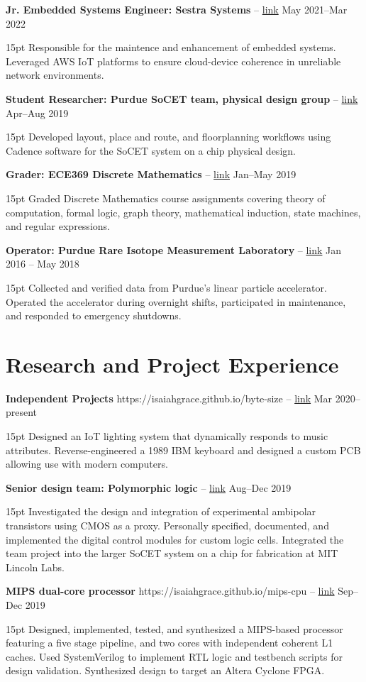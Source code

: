 \documentclass[10pt,letterpaper]{article}
\newcommand{\resumeItem}[4]{
	\begingroup
	\def\link{#2}
	\textbf{#1}
	\ifx\link\empty \else 
		-- \href{#2}{link}
	\fi
	\hfill #3\\
	\begin{adjustwidth}{15pt}{}
	#4
	\end{adjustwidth}
	\endgroup
}
\begin{document}
\resumeItem
{Jr. Embedded Systems Engineer: Sestra Systems}
{}
{May 2021--Mar 2022}
{Responsible for the maintence and enhancement of embedded systems. Leveraged AWS IoT platforms to ensure cloud-device coherence in unreliable network environments.}

\resumeItem
{Student Researcher: Purdue SoCET team, physical design group}
{}
{Apr--Aug 2019}
{Developed layout, place and route, and floorplanning workflows using Cadence software for the SoCET system on a chip physical design.}

\resumeItem
{Grader: ECE369 Discrete Mathematics}
{}
{Jan--May 2019}
{Graded Discrete Mathematics course assignments covering theory of computation, formal logic, graph theory, mathematical induction, state machines, and regular expressions.}

\resumeItem
{Operator: Purdue Rare Isotope Measurement Laboratory}
{}
{Jan 2016 -- May 2018}
{Collected and verified data from Purdue's linear particle accelerator. Operated the accelerator during overnight shifts, participated in maintenance, and responded to emergency shutdowns.}

\section*{Research and Project Experience}
\resumeItem
{Independent Projects}
{https://isaiahgrace.github.io/byte-size}
{Mar 2020--present}
{Designed an IoT lighting system that dynamically responds to music attributes. Reverse-engineered a 1989 IBM keyboard and designed a custom PCB allowing use with modern computers.}

\resumeItem
{Senior design team: Polymorphic logic}
{}
{Aug--Dec 2019}
{Investigated the design and integration of experimental ambipolar transistors using CMOS as a proxy. Personally specified, documented, and implemented the digital control modules for custom logic cells. Integrated the team project into the larger SoCET system on a chip for fabrication at MIT Lincoln Labs.}

\resumeItem
{MIPS dual-core processor}
{https://isaiahgrace.github.io/mips-cpu}
{Sep--Dec 2019}
{Designed, implemented, tested, and synthesized a MIPS-based processor featuring a five stage pipeline, and two cores with independent coherent L1 caches. Used SystemVerilog to implement RTL logic and testbench scripts for design validation. Synthesized design to target an Altera Cyclone FPGA.}
\end{document}
